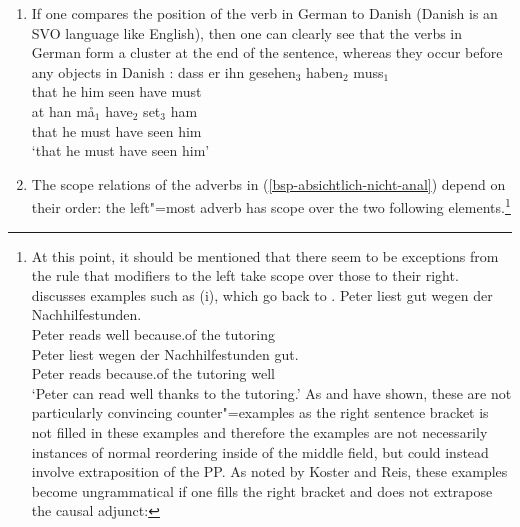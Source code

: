 \begin{enumerate}
\item If one compares the position of the verb in German to Danish (Danish is an SVO language
like English), then one can clearly see that the verbs in German form a cluster at the end of the sentence,
whereas they occur before any objects in Danish \citep[]{Oersnes2009b}:
\eal
\ex 
\gll dass er ihn gesehen$_3$ haben$_2$ muss$_1$\\
	 that he him seen have must\\
\ex 
\gll at han må$_1$ have$_2$ set$_3$ ham\\
     that he must have seen him\\
\glt `that he must have seen him'
\zl
\item\label{SOV-Skopus} The scope relations of the adverbs in (\ref{bsp-absichtlich-nicht-anal}) depend on their order:
the left"=most adverb has scope over the two following elements.\footnote{%
At this point, it should be mentioned that there seem to be exceptions from the rule that modifiers to the left take scope over those to
their right. \citet*[]{Kasper94a} discusses examples such as (i), which go back to \citet*[]{BV72}.
\eal
\label{bsp-peter-liest-gut-wegen}
\ex 
\gll Peter liest gut wegen der Nachhilfestunden.\\
	 Peter reads well because.of the tutoring\\
\ex 
\gll Peter liest wegen der Nachhilfestunden gut.\\
	 Peter reads because.of the tutoring well\\
\glt `Peter can read well thanks to the tutoring.'
\zl
	As \citet[Section~6]{Koster75a} and \citet*[]{Reis80a} have shown, these are not particularly convincing counter"=examples
	as the right sentence bracket is not filled in these examples and therefore the examples are
        not necessarily instances of normal reordering inside of the middle field, but could instead
        involve extraposition of the PP.
	As noted by Koster and Reis, these examples become ungrammatical if one fills the right bracket and does not extrapose the causal adjunct:
\eal
{}
}
\end{enumerate}
